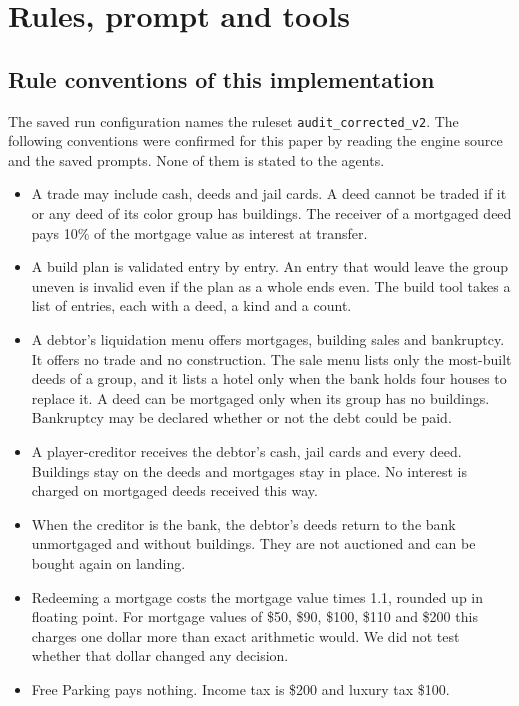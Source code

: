 \section{Rules, prompt and tools}
\label{app:rules}

\subsection{Rule conventions of this implementation}

The saved run configuration names the ruleset \texttt{audit\_corrected\_v2}. The following conventions were confirmed for this paper by reading the engine source and the saved prompts. None of them is stated to the agents.

\begin{itemize}
\item A trade may include cash, deeds and jail cards. A deed cannot be traded if it or any deed of its color group has buildings. The receiver of a mortgaged deed pays 10\% of the mortgage value as interest at transfer.
\item A build plan is validated entry by entry. An entry that would leave the group uneven is invalid even if the plan as a whole ends even. The build tool takes a list of entries, each with a deed, a kind and a count.
\item A debtor's liquidation menu offers mortgages, building sales and bankruptcy. It offers no trade and no construction. The sale menu lists only the most-built deeds of a group, and it lists a hotel only when the bank holds four houses to replace it. A deed can be mortgaged only when its group has no buildings. Bankruptcy may be declared whether or not the debt could be paid.
\item A player-creditor receives the debtor's cash, jail cards and every deed. Buildings stay on the deeds and mortgages stay in place. No interest is charged on mortgaged deeds received this way.
\item When the creditor is the bank, the debtor's deeds return to the bank unmortgaged and without buildings. They are not auctioned and can be bought again on landing.
\item Redeeming a mortgage costs the mortgage value times 1.1, rounded up in floating point. For mortgage values of \$50, \$90, \$100, \$110 and \$200 this charges one dollar more than exact arithmetic would. We did not test whether that dollar changed any decision.
\item Free Parking pays nothing. Income tax is \$200 and luxury tax \$100.
\end{itemize}

